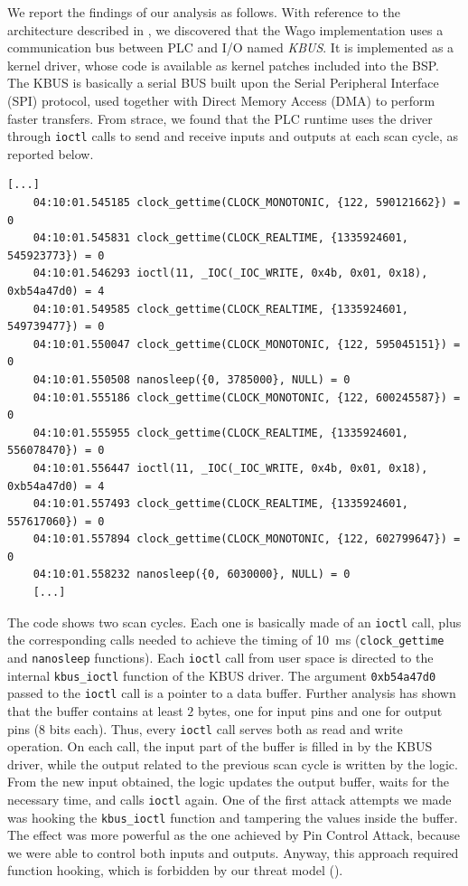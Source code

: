 We report the findings of our analysis as follows. With reference to the architecture described in , we discovered that the Wago implementation
uses a communication bus between PLC and I/O named \emph{KBUS}. It is implemented as a kernel driver, whose code is available as kernel patches included into the BSP.
The KBUS is basically a serial BUS built upon the Serial Peripheral Interface (SPI) protocol, used together with Direct Memory Access (DMA) to perform faster transfers.
From strace, we found that the PLC runtime uses the driver through \verb|ioctl| calls to send and receive inputs and outputs at each scan cycle, as reported below.
\begin{Verbatim}[fontsize=\small]
	[...]
	04:10:01.545185 clock_gettime(CLOCK_MONOTONIC, {122, 590121662}) = 0
	04:10:01.545831 clock_gettime(CLOCK_REALTIME, {1335924601, 545923773}) = 0
	04:10:01.546293 ioctl(11, _IOC(_IOC_WRITE, 0x4b, 0x01, 0x18), 0xb54a47d0) = 4
	04:10:01.549585 clock_gettime(CLOCK_REALTIME, {1335924601, 549739477}) = 0
	04:10:01.550047 clock_gettime(CLOCK_MONOTONIC, {122, 595045151}) = 0
	04:10:01.550508 nanosleep({0, 3785000}, NULL) = 0
	04:10:01.555186 clock_gettime(CLOCK_MONOTONIC, {122, 600245587}) = 0
	04:10:01.555955 clock_gettime(CLOCK_REALTIME, {1335924601, 556078470}) = 0
	04:10:01.556447 ioctl(11, _IOC(_IOC_WRITE, 0x4b, 0x01, 0x18), 0xb54a47d0) = 4
	04:10:01.557493 clock_gettime(CLOCK_REALTIME, {1335924601, 557617060}) = 0
	04:10:01.557894 clock_gettime(CLOCK_MONOTONIC, {122, 602799647}) = 0
	04:10:01.558232 nanosleep({0, 6030000}, NULL) = 0
	[...]
\end{Verbatim}
The code shows two scan cycles. Each one is basically made of an \verb|ioctl| call, plus the corresponding calls needed to achieve the timing
of \SI{10}{ms} (\verb|clock_gettime| and \verb|nanosleep| functions).
Each \verb|ioctl| call from user space is directed to the internal \verb|kbus_ioctl| function of the KBUS driver.
The argument \verb|0xb54a47d0| passed to the \verb|ioctl| call is a pointer to a data buffer. Further analysis has shown that the buffer contains at least $2$
bytes, one for input pins and one for output pins ($8$ bits each). Thus, every \verb|ioctl| call serves both as read and write operation.
On each call, the input part of the buffer is filled in by the KBUS driver, while the output related to the previous scan cycle is written by the logic.
From the new input obtained, the logic updates the output buffer, waits for the necessary time, and calls \verb|ioctl| again.
One of the first attack attempts we made was hooking the \verb|kbus_ioctl| function and tampering the values
inside the buffer. The effect was more powerful as the one achieved by Pin Control Attack, because we were able to control both inputs and outputs. Anyway, this approach required
function hooking, which is forbidden by our threat model ().

